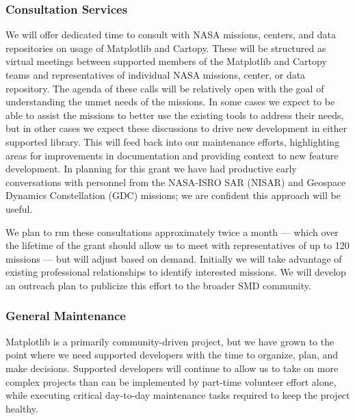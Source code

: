 \documentclass[12pt]{article}
\numberwithin{page}{section}
\begin{document}
\subsubsection{Consultation Services}

We will offer dedicated time to consult with NASA missions, centers, and data
repositories on usage of Matplotlib and Cartopy.  These will be structured as
virtual meetings between supported members of the Matplotlib and Cartopy teams
and representatives of individual NASA missions, center, or data repository.
The agenda of these calls will be relatively open with the goal of
understanding the unmet needs of the missions.  In some cases we expect to be
able to assist the missions to better use the existing tools to address their
needs, but in other cases we expect these discussions to drive new development
in either supported library.  This will feed back into our maintenance efforts,
highlighting areas for improvements in documentation and providing context to
new feature development.  In planning for this grant we have had productive early
conversations with personnel from the NASA-ISRO SAR (NISAR) and Geospace Dynamics Constellation
(GDC) missions; we are confident this approach will be useful.


We plan to run these consultations approximately twice a month --- which over
the lifetime of the grant should allow us to meet with representatives of up to
120 missions --- but will adjust based on demand.  Initially we will
take advantage of existing professional relationships to identify interested
missions.  We will develop an outreach plan to publicize
this effort to the broader SMD community.



\subsubsection{General Maintenance}

Matplotlib is a primarily community-driven project, but we have grown to the
point where we need supported developers with the time to organize, plan, and
make decisions.  Supported developers will continue to allow us to take on more
complex projects than can be implemented by part-time volunteer effort alone,
while executing critical day-to-day maintenance tasks required to keep the
project healthy.
\end{document}
